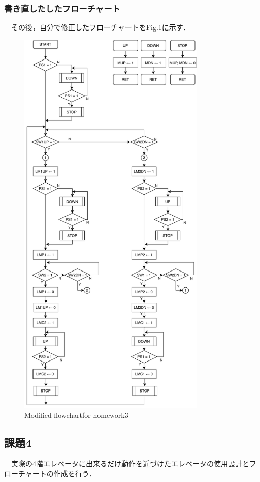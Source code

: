 \subsubsection{書き直したしたフローチャート}
　その後，自分で修正したフローチャートをFig.\ref{fig:kadai3}に示す．
\begin{figure}[H]
    \centering
    \includegraphics[width=9cm]{./fig/kadai3.pdf}
    \caption{Modified flowchartfor homework3}
    \label{fig:kadai3}
\end{figure}


\subsection{課題4}
　実際の4階エレベータに出来るだけ動作を近づけたエレベータの使用設計とフローチャートの作成を行う．

